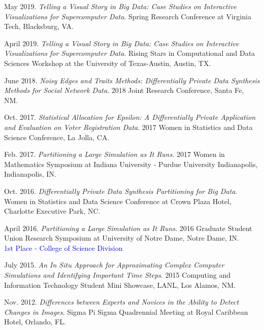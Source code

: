 \begin{etaremune}[topsep=0pt, itemsep=4pt, partopsep=0pt, parsep=0pt]
    \item May 2019. \textit{Telling a Visual Story in Big Data: Case Studies on Interactive Visualizations for Supercomputer Data}. Spring Research Conference at Virginia Tech, Blacksburg, VA.
    
    \item April 2019. \textit{Telling a Visual Story in Big Data: Case Studies on Interactive Visualizations for Supercomputer Data}. Rising Stars in Computational and Data Sciences Workshop at the University of Texas-Austin, Austin, TX.
    
    \item June 2018. \textit{Noisy Edges and Traits Methods: Differentially Private Data Synthesis Methods for Social Network Data}. 2018 Joint Research Conference, Santa Fe, NM.
    
    \item Oct. 2017. \textit{Statistical Allocation for Epsilon: A Differentially Private Application and Evaluation on Voter Registration Data}. 2017 Women in Statistics and Data Science Conference, La Jolla, CA.
    
    \item Feb. 2017. \textit{Partitioning a Large Simulation as It Runs}. 2017 Women in Mathematics Symposium at Indiana University - Purdue University Indianapolis, Indianapolis, IN.
    
    \item Oct. 2016. \textit{Differentially Private Data Synthesis Partitioning for Big Data}. Women in Statistics and Data Science Conference at Crown Plaza Hotel, Charlotte Executive Park, NC. 
    
    \item April 2016. \textit{Partitioning a Large Simulation as It Runs}. 2016 Graduate Student Union Research Symposium at University of Notre Dame, Notre Dame, IN.\\
    \textcolor{blue}{1st Place - College of Science Division}
    
    \item July 2015. \textit{An In Situ Approach for Approximating Complex Computer Simulations and Identifying Important Time Steps}. 2015 Computing and Information Technology Student Mini Showcase, LANL, Los Alamos, NM.
    
    \item Nov. 2012. \textit{Differences between Experts and Novices in the Ability to Detect Changes in Images}. Sigma Pi Sigma Quadrennial Meeting at Royal Caribbean Hotel, Orlando, FL.
    

\end{etaremune}
